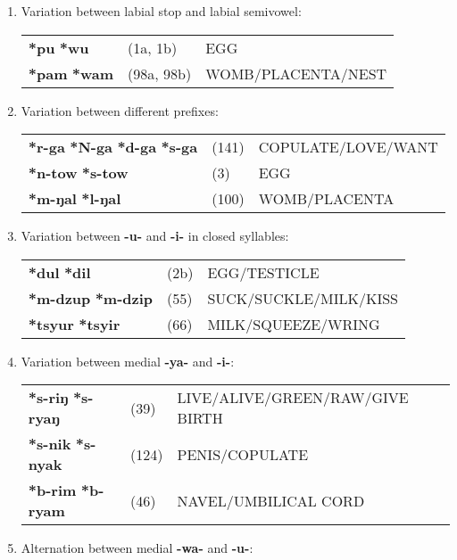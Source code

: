 \begin{enumerate}
\item %
Variation between labial stop and labial semivowel:

\begin{tabular}{lll}
\textbf{*pu} \STEDTU{⪤} \textbf{*wu} 	&(1a, 1b)		&EGG\\
\textbf{*pam} \STEDTU{⪤} \textbf{*wam}	&(98a, 98b)	&WOMB/PLACENTA/NEST\\
\end{tabular}

\item %
Variation between different prefixes:

\begin{tabular}{lll}
\textbf{*r-ga} \STEDTU{⪤} \textbf{*N-ga} \STEDTU{⪤} \textbf{*d-ga} \STEDTU{⪤} \textbf{*s-ga} &(141)	&COPULATE/LOVE/WANT\\
\textbf{*n-tow} \STEDTU{⪤} \textbf{*s-tow} &(3)		&EGG\\
\textbf{*m-ŋal} \STEDTU{⪤} \textbf{*l-ŋal} &(100)		&WOMB/PLACENTA\\
\end{tabular}

\item %
Variation between \textbf{-u-} and \textbf{-i-} in closed syllables:

\begin{tabular}{lll}
\textbf{*dul} \STEDTU{⪤} \textbf{*dil} 		&(2b)	&EGG/TESTICLE\\
\textbf{*m-dzup} \STEDTU{⪤} \textbf{*m-dzip}	&(55)	&SUCK/SUCKLE/MILK/KISS\\
\textbf{*tsyur} \STEDTU{⪤} \textbf{*tsyir}	&(66)	&MILK/SQUEEZE/WRING\\
\end{tabular}

\item %
Variation between medial \textbf{-ya-} and \textbf{-i-}:

\begin{tabular}{lll}
\textbf{*s-riŋ} \STEDTU{⪤} \textbf{*s-ryaŋ} &(39)	&LIVE/ALIVE/GREEN/RAW/GIVE BIRTH\\
\textbf{*s-nik} \STEDTU{⪤} \textbf{*s-nyak} &(124)	&PENIS/COPULATE\\
\textbf{*b-rim} \STEDTU{⪤} \textbf{*b-ryam} &(46)	&NAVEL/UMBILICAL CORD\\
\end{tabular}

\item %
Alternation between medial \textbf{-wa-} and \textbf{-u-}:


\end{enumerate}

